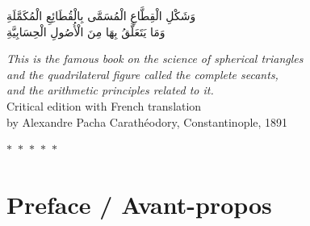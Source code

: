 \documentclass[11pt,a4paper]{article}
\theoremstyle{plain}
\theoremstyle{definition}
\theoremstyle{remark}
\newcommand{\dblornament}{\begin{center}\textcolor{goldaccent}{$\ast$~$\ast$~$\ast$~$\ast$~$\ast$}\end{center}}
\begin{document}
\begin{center}
{وَشَكْلِ الْقِطَّاعِ الْمُسَمَّى بِالْقُطَائِعِ الْمُكَمَّلَةِ \\

وَمَا يَتَعَلَّقُ بِهَا مِنَ الْأُصُولِ الْحِسَابِيَّةِ}



\vspace{0.5cm}

{\small\textit{This is the famous book on the science of spherical triangles}}\\

{\small\textit{and the quadrilateral figure called the complete secants,}}\\

{\small\textit{and the arithmetic principles related to it.}}\\[1.5cm]



{\small Critical edition with French translation}\\

{\small by Alexandre Pacha Carathéodory, Constantinople, 1891}\\[0.5cm]



\dblornament



\end{center}

\clearpage






\tableofcontents

\clearpage






\section*{Preface / Avant-propos}

\end{document}
